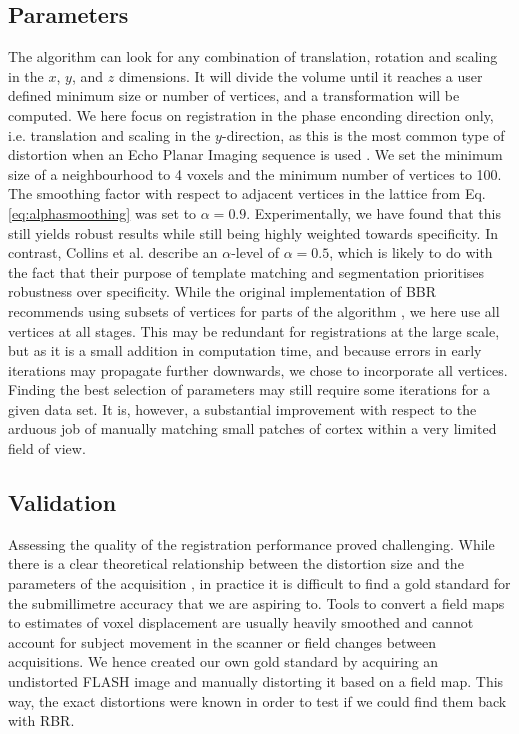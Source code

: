 \subsection{Parameters}
The algorithm can look for any combination of translation, rotation and scaling in the $x$, $y$, and $z$ dimensions. It will divide the volume until it reaches a user defined minimum size or number of vertices, and a transformation will be computed. We here focus on registration in the phase enconding direction only, i.e. translation and scaling in the $y$-direction, as this is the most common type of distortion when an Echo Planar Imaging sequence is used \cite{Mansfield1977}. We set the minimum size of a neighbourhood to 4 voxels and the minimum number of vertices to 100. The smoothing factor with respect to adjacent vertices in the lattice from Eq.\ref{eq:alphasmoothing} was set to $\alpha=0.9$. Experimentally, we have found that this still yields robust results while still being highly weighted towards specificity. In contrast, Collins et al. \cite{Collins1995} describe an $\alpha$-level of $\alpha=0.5$, which is likely to do with the fact that their purpose of template matching and segmentation prioritises robustness over specificity. While the original implementation of BBR recommends using subsets of vertices for parts of the algorithm \cite{Greve2009}, we here use all vertices at all stages. This may be redundant for registrations at the large scale, but as it is a small addition in computation time, and because errors in early iterations may propagate further downwards, we chose to incorporate all vertices. Finding the best selection of parameters may still require some iterations for a given data set. It is, however, a substantial improvement with respect to the arduous job of manually matching small patches of cortex within a very limited field of view. 

\subsection{Validation}
Assessing the quality of the registration performance proved challenging. While there is a clear theoretical relationship between the distortion size and the parameters of the acquisition \cite{Jezzard1995}, in practice it is difficult to find a gold standard for the submillimetre accuracy that we are aspiring to. Tools to convert a field maps to estimates of voxel displacement are usually heavily smoothed and cannot account for subject movement in the scanner or field changes between acquisitions. We hence created our own gold standard by acquiring an undistorted FLASH image and manually distorting it based on a field map. This way, the exact distortions were known in order to test if we could find them back with RBR. 

